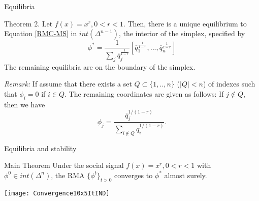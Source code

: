 
\begin{frame}[c]{Equilibria}
\begin{exampleblock}{Theorem 2.} 
\label{eqs}
Let $f(x)=x^r, 0<r<1$. Then, there is a unique equilibrium to Equation \eqref{RMC-MS} 
in $int(\Delta^{n-1})$, the interior of the simplex, specified by 
\[
\phi^*=\dfrac{1}{\sum_j
  \overline{q}_j^{\frac{1}{1-r}}}[\overline{q}_1^{\frac{1}{1-r}},...,\overline{q}_n^{\frac{1}{1-r}}]
\]
The remaining equilibria are on the boundary of the simplex.
\end{exampleblock}


\textcolor{anugold}{\textit{Remark:}}
If assume that there exists a set $Q\subset \{1,..,n\}$
($|Q|<n$) of indexes such that $\phi_i=0$ if $i\in Q$. The remaining coordinates are given as follows: If $j \notin
Q$, then we have
\[
\phi_j=\frac{\overline{q}_j^{1/(1-r)}}{\sum_{i\notin Q}\overline{q}_i^{1/(1-r)}}.
\]

%
\end{frame}



\begin{frame}[c]{Equilibria and stability}
\begin{exampleblock}{Main Theorem} 
\label{thm:ict} 
Under the social signal $f(x)=x^r, 0<r<1$ with $\phi^0\in
int(\Delta^n)$, the RMA $\{\phi^t\}_{t>0}$ converges to $\phi^*$
almost surely.
\end{exampleblock}

\begin{center}
\texttt{[image: Convergence10x5ItIND]}
\end{center}



\end{frame}


